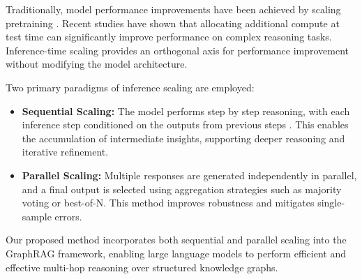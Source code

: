 Traditionally, model performance improvements have been achieved by scaling pretraining \citep{10.5555/3495724.3495883, hoffmann2022trainingcomputeoptimallargelanguage}. Recent studies have shown that allocating additional compute at test time \citep{uesato2022solvingmathwordproblems, 10.5555/3600270.3600548} can significantly improve performance on complex reasoning tasks. Inference-time scaling provides an orthogonal axis for performance improvement without modifying the model architecture.

Two primary paradigms of inference scaling are employed:

\begin{itemize}
    \item \textbf{Sequential Scaling:} The model performs step by step reasoning, with each inference step conditioned on the outputs from previous steps \citep{muennighoff2025s1simpletesttimescaling}. This enables the accumulation of intermediate insights, supporting deeper reasoning and iterative refinement.   

    \item \textbf{Parallel Scaling:} Multiple responses are generated independently \citep{brown2024largelanguagemonkeysscaling} in parallel, and a final output is selected using aggregation strategies such as majority voting or best-of-N. This method improves robustness and mitigates single-sample errors.
\end{itemize}

Our proposed method incorporates both sequential and parallel scaling into the GraphRAG framework, enabling large language models to perform efficient and effective multi-hop reasoning over structured knowledge graphs.
